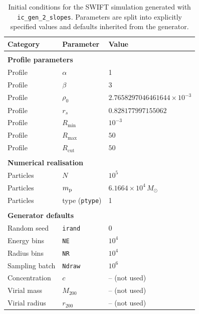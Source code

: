 \begin{table}[H]
\centering
\caption{Initial conditions for the SWIFT simulation generated with \texttt{ic\_gen\_2\_slopes}. Parameters are split into explicitly specified values and defaults inherited from the generator.}
\label{tab:ic_swift_full}
\begin{tabular}{lll}
\hline
\textbf{Category} & \textbf{Parameter} & \textbf{Value} \\
\hline
\\
\multicolumn{3}{l}{\textbf{Profile parameters}} \\
Profile & $\alpha$ & 1 \\
Profile & $\beta$ & 3 \\
Profile & $\rho_0$ & $2.7658297046461644\times10^{-3}$ \\
Profile & $r_s$ & $0.828177997155062$ \\
Profile & $R_{\min}$ & $10^{-3}$ \\
Profile & $R_{\max}$ & $50$ \\
Profile & $R_{\mathrm{cut}}$ & $50$ \\
\\
\multicolumn{3}{l}{\textbf{Numerical realisation}} \\
Particles & $N$ & $10^5$ \\
Particles & $m_{\rm p}$ & $6.1664\times10^4\,M_\odot$ \\
Particles & type (\texttt{ptype}) & 1 \\
\\
\multicolumn{3}{l}{\textbf{Generator defaults}} \\
Random seed & \texttt{irand} & 0 \\
Energy bins & \texttt{NE} & $10^4$ \\
Radius bins & \texttt{NR} & $10^4$ \\
Sampling batch & \texttt{Ndraw} & $10^6$ \\
Concentration & $c$ & -- (not used) \\
Virial mass & $M_{200}$ & -- (not used) \\
Virial radius & $r_{200}$ & -- (not used) \\
\hline
\end{tabular}
\end{table}


